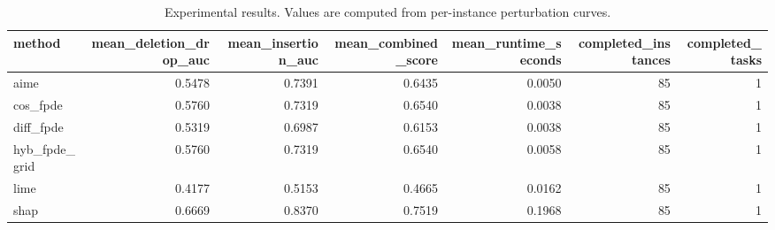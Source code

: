 \begin{table}[t]
\caption{Experimental results. Values are computed from per-instance perturbation curves.}
\label{tab:main_results_computed}
\centering
\begin{tabular}{lrrrrrr}
\toprule
method & mean\_deletion\_drop\_auc & mean\_insertion\_auc & mean\_combined\_score & mean\_runtime\_seconds & completed\_instances & completed\_tasks \\
\midrule
aime & 0.5478 & 0.7391 & 0.6435 & 0.0050 & 85 & 1 \\
cos\_fpde & 0.5760 & 0.7319 & 0.6540 & 0.0038 & 85 & 1 \\
diff\_fpde & 0.5319 & 0.6987 & 0.6153 & 0.0038 & 85 & 1 \\
hyb\_fpde\_grid & 0.5760 & 0.7319 & 0.6540 & 0.0058 & 85 & 1 \\
lime & 0.4177 & 0.5153 & 0.4665 & 0.0162 & 85 & 1 \\
shap & 0.6669 & 0.8370 & 0.7519 & 0.1968 & 85 & 1 \\
\bottomrule
\end{tabular}

\end{table}

